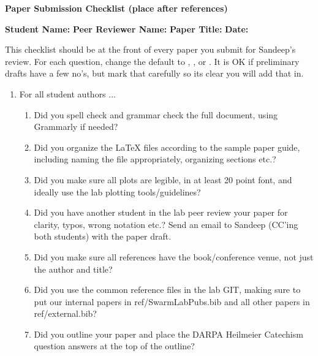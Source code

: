 \noindent \textbf{Paper Submission Checklist (place after references)}

\noindent \textbf{Student Name: } \newline
\noindent \textbf{Peer Reviewer Name: }  \newline
\noindent \textbf{Paper Title: } \newline
\noindent \textbf{Date: } \newline



This checklist should be at the front of every paper you submit for Sandeep's review. 
For each question, change the default \answerTODO{} to \answerYes{},
\answerNo{}, or \answerNA{}. It is OK if preliminary drafts have a few no's, but mark that carefully so its clear you will add that in.


\begin{enumerate}

\item For all student authors ...
\begin{enumerate}
    \item Did you spell check and grammar check the full document, using Grammarly if needed?
    \answerTODO{}
    \item Did you organize the LaTeX files according to the sample paper guide, including naming the file appropriately, organizing sections etc.? \answerTODO{}
  \item Did you make sure all plots are legible, in at least 20 point font, and ideally use the lab plotting tools/guidelines? \answerTODO{}
  \item Did you have another student in the lab peer review your paper for clarity, typos, wrong notation etc.? Send an email to Sandeep (CC'ing both students) with the paper draft. \answerTODO{}
  \item Did you make sure all references have the book/conference venue, not just the author and title? \answerTODO{}
  \item Did you use the common reference files in the lab GIT, making sure to put our internal papers in ref/SwarmLabPubs.bib and all other papers in ref/external.bib? \answerTODO{}
  \item Did you outline your paper and place the DARPA Heilmeier Catechism question answers at the top of the outline? \answerTODO{}
\end{enumerate}

\end{enumerate}
